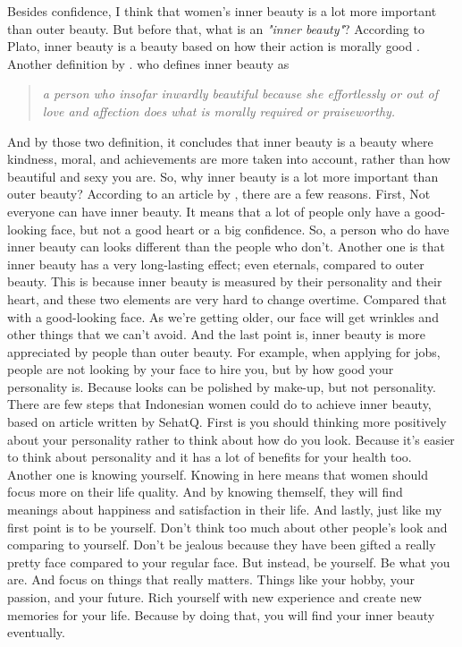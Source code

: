 \documentclass[12pt]{article}
\begin{document}
\begin{refsection}
    Besides confidence, I think that women's inner beauty is a lot more important
    than outer beauty. But before that, what is an \emph{"inner beauty"}? According
    to Plato, inner beauty is a beauty based on how their action is morally good
    \parencite{wisnubrataCaraMemancarkanInner2020}. Another definition by \citeauthor{schmalzriedInnerBeautyFriendshipHypothesis2013}.
    who defines inner beauty as
    \begin{quote}
        \emph{a person who insofar inwardly beautiful
        because she effortlessly or out of love and affection does what is morally
        required or praiseworthy.}
    \end{quote}
    And by those two definition, it concludes that inner beauty is a beauty where 
    kindness, moral, and achievements are more taken into account, rather than 
    how beautiful and sexy you are.
    So, why inner beauty is a lot more important than outer beauty? According to
    an article by \citeauthor[]{fimela.comIniAlasanMengapa2018}, there are a few
    reasons. First, Not everyone can have inner beauty. It means that a lot of people 
    only have a good-looking face, but not a good heart or a big confidence. 
    So, a person who do have inner beauty can looks different than the people
    who don't. Another one is that inner beauty has a very long-lasting effect;
    even eternals, compared to outer beauty. This is because inner beauty is
    measured by their personality and their heart, and these two elements are 
    very hard to change overtime. Compared that with a good-looking face. As we're
    getting older, our face will get wrinkles and other things that we can't avoid.
    And the last point is, inner beauty is more appreciated by people than outer
    beauty. For example, when applying for jobs, people are not looking by your
    face to hire you, but by how good your personality is. Because looks can
    be polished by make-up, but not personality.
    There are few steps that Indonesian women could do to achieve inner beauty,
    based on article written by SehatQ. First is you should thinking more positively 
    about your personality rather to think about how do you look. Because it's easier 
    to think about personality and it has a lot of benefits for your health too.
    Another one is knowing yourself. Knowing in here means that women should 
    focus more on their life quality. And by knowing themself, they will find 
    meanings about happiness and satisfaction in their life.
    And lastly, just like my first point is to be yourself. Don't think too much
    about other people's look and comparing to yourself. Don't be jealous because 
    they have been gifted a really pretty face compared to your regular face. But 
    instead, be yourself. Be what you are. And focus on things that really matters.
    Things like your hobby, your passion, and your future. Rich yourself with 
    new experience and create new memories for your life. Because by doing that,
    you will find your inner beauty eventually.
    

\end{refsection}
\end{document}
